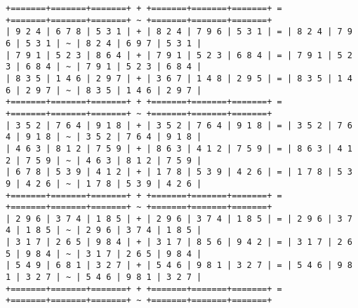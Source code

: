 \begin{verbatim}
+=======+=======+=======+ + +=======+=======+=======+ = +=======+=======+=======+ ~ +=======+=======+=======+
| 9 2 4 | 6 7 8 | 5 3 1 | + | 8 2 4 | 7 9 6 | 5 3 1 | = | 8 2 4 | 7 9 6 | 5 3 1 | ~ | 8 2 4 | 6 9 7 | 5 3 1 |
| 7 9 1 | 5 2 3 | 8 6 4 | + | 7 9 1 | 5 2 3 | 6 8 4 | = | 7 9 1 | 5 2 3 | 6 8 4 | ~ | 7 9 1 | 5 2 3 | 6 8 4 |
| 8 3 5 | 1 4 6 | 2 9 7 | + | 3 6 7 | 1 4 8 | 2 9 5 | = | 8 3 5 | 1 4 6 | 2 9 7 | ~ | 8 3 5 | 1 4 6 | 2 9 7 |
+=======+=======+=======+ + +=======+=======+=======+ = +=======+=======+=======+ ~ +=======+=======+=======+
| 3 5 2 | 7 6 4 | 9 1 8 | + | 3 5 2 | 7 6 4 | 9 1 8 | = | 3 5 2 | 7 6 4 | 9 1 8 | ~ | 3 5 2 | 7 6 4 | 9 1 8 |
| 4 6 3 | 8 1 2 | 7 5 9 | + | 8 6 3 | 4 1 2 | 7 5 9 | = | 8 6 3 | 4 1 2 | 7 5 9 | ~ | 4 6 3 | 8 1 2 | 7 5 9 |
| 6 7 8 | 5 3 9 | 4 1 2 | + | 1 7 8 | 5 3 9 | 4 2 6 | = | 1 7 8 | 5 3 9 | 4 2 6 | ~ | 1 7 8 | 5 3 9 | 4 2 6 |
+=======+=======+=======+ + +=======+=======+=======+ = +=======+=======+=======+ ~ +=======+=======+=======+
| 2 9 6 | 3 7 4 | 1 8 5 | + | 2 9 6 | 3 7 4 | 1 8 5 | = | 2 9 6 | 3 7 4 | 1 8 5 | ~ | 2 9 6 | 3 7 4 | 1 8 5 |
| 3 1 7 | 2 6 5 | 9 8 4 | + | 3 1 7 | 8 5 6 | 9 4 2 | = | 3 1 7 | 2 6 5 | 9 8 4 | ~ | 3 1 7 | 2 6 5 | 9 8 4 |
| 5 4 9 | 6 8 1 | 3 2 7 | + | 5 4 6 | 9 8 1 | 3 2 7 | = | 5 4 6 | 9 8 1 | 3 2 7 | ~ | 5 4 6 | 9 8 1 | 3 2 7 |
+=======+=======+=======+ + +=======+=======+=======+ = +=======+=======+=======+ ~ +=======+=======+=======+
\end{verbatim}


